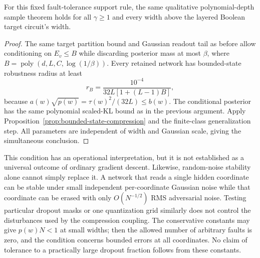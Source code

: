 \begin{corollary}
\label{cor:fault-prior}
For this fixed fault-tolerance support rule, the same qualitative
polynomial-depth sample theorem holds for all $\gamma\ge1$ and every
width above the layered Boolean target circuit's width.
\end{corollary}
\begin{proof}
The same target partition bound and Gaussian readout tail as before allow
conditioning on $E_v\le B$ while discarding posterior mass at most
$\beta$, where $B=\operatorname{poly}(d,L,C,\log(1/\beta))$.
Every retained network has bounded-state robustness radius at least
\[
 r_B=\frac{10^{-4}}{32L[1+(L-1)B]},
\]
because $a(w)\sqrt{p(w)}=\tau(w)^2/(32L)\le b(w)$.
The conditional posterior has the same polynomial scaled-KL bound as in
the previous argument. Apply Proposition~\ref{prop:bounded-state-compression}
and the finite-class generalization step. All parameters are independent
of width and Gaussian scale, giving the simultaneous conclusion.
\end{proof}

This condition has an operational interpretation, but it is not established
as a universal outcome of ordinary gradient descent. Likewise, random-noise
stability alone cannot simply replace it. A network that reads a single
hidden coordinate can be stable under small independent per-coordinate
Gaussian noise while that coordinate can be erased with only
$O(N^{-1/2})$ RMS adversarial noise. Testing particular dropout masks or
one quantization grid similarly does not control the disturbances used by
the compression coupling.
The conservative constants may give $p(w)N<1$ at small widths; then the
allowed number of arbitrary faults is zero, and the condition concerns
bounded errors at all coordinates. No claim of tolerance to a practically
large dropout fraction follows from these constants.
